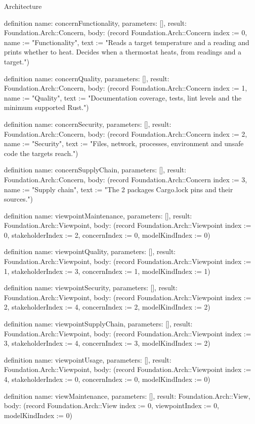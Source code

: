 \begin{lexlean}{Architecture}
\begin{semanticmodule}
definition{
  name: concernFunctionality,
  parameters: [],
  result: Foundation.Arch::Concern,
  body: (record Foundation.Arch::Concern {index := 0, name := "Functionality", text := "Reads a target temperature and a reading and prints whether to heat. Decides when a thermostat heats, from readings and a target."})
}

definition{
  name: concernQuality,
  parameters: [],
  result: Foundation.Arch::Concern,
  body: (record Foundation.Arch::Concern {index := 1, name := "Quality", text := "Documentation coverage, tests, lint levels and the minimum supported Rust."})
}

definition{
  name: concernSecurity,
  parameters: [],
  result: Foundation.Arch::Concern,
  body: (record Foundation.Arch::Concern {index := 2, name := "Security", text := "Files, network, processes, environment and unsafe code the targets reach."})
}

definition{
  name: concernSupplyChain,
  parameters: [],
  result: Foundation.Arch::Concern,
  body: (record Foundation.Arch::Concern {index := 3, name := "Supply chain", text := "The 2 packages Cargo.lock pins and their sources."})
}

definition{
  name: viewpointMaintenance,
  parameters: [],
  result: Foundation.Arch::Viewpoint,
  body: (record Foundation.Arch::Viewpoint {index := 0, stakeholderIndex := 2, concernIndex := 0, modelKindIndex := 0})
}

definition{
  name: viewpointQuality,
  parameters: [],
  result: Foundation.Arch::Viewpoint,
  body: (record Foundation.Arch::Viewpoint {index := 1, stakeholderIndex := 3, concernIndex := 1, modelKindIndex := 1})
}

definition{
  name: viewpointSecurity,
  parameters: [],
  result: Foundation.Arch::Viewpoint,
  body: (record Foundation.Arch::Viewpoint {index := 2, stakeholderIndex := 4, concernIndex := 2, modelKindIndex := 2})
}

definition{
  name: viewpointSupplyChain,
  parameters: [],
  result: Foundation.Arch::Viewpoint,
  body: (record Foundation.Arch::Viewpoint {index := 3, stakeholderIndex := 4, concernIndex := 3, modelKindIndex := 2})
}

definition{
  name: viewpointUsage,
  parameters: [],
  result: Foundation.Arch::Viewpoint,
  body: (record Foundation.Arch::Viewpoint {index := 4, stakeholderIndex := 0, concernIndex := 0, modelKindIndex := 0})
}

definition{
  name: viewMaintenance,
  parameters: [],
  result: Foundation.Arch::View,
  body: (record Foundation.Arch::View {index := 0, viewpointIndex := 0, modelKindIndex := 0})
}


\end{semanticmodule}
\end{lexlean}
